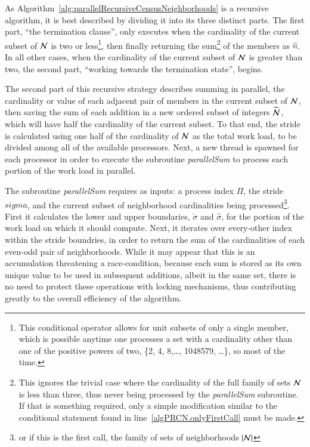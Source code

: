 As Algorithm~\ref{alg:parallelRecursiveCensusNeighborhoods} is a recursive algorithm, it is best described by dividing it into its three distinct parts. The first part, ``the termination clause'', only executes when the cardinality of the current subset of $\mathcal{N}$ is two or less\footnote{This conditional operator allows for unit subsets of only a single member, which is possible anytime one processes a set with a cardinality other than one of the positive powers of two, \{2, 4, 8,\ldots , 1048579, \ldots\}, so most of the time.}, then finally returning the sum\footnote{This ignores the trivial case where the cardinality of the full family of sets $\mathcal{N}$ is less than three, thus never being processed by the \textit{parallelSum} subroutine. If that is something required, only a simple modification similar to the conditional statement found in line~\ref{algPRCN.onlyFirstCall} must be made.} of the members as $\hat{n}$. In all other cases, when the cardinality of the current subset of $\mathcal{N}$ is greater than two, the second part, ``working towards the termination state'', begins.

The second part of this recursive strategy describes summing in parallel, the cardinality or value of each adjacent pair of members in the current subset of $\mathcal{N}$, then saving the sum of each addition in a new ordered subset of integers $\widetilde{\mathcal{N}}$, which will have half the cardinality of the current subset. To that end, the stride is calculated using one half of the cardinality of $\mathcal{N}$ as the total work load, to be divided among all of the available processors. Next, a new thread is spawned for each processor in order to execute the subroutine \textit{parallelSum} to process each portion of the work load in parallel.

The subroutine \textit{parallelSum} requires as inputs: a process index $\Pi$, the stride $sigma$, and the current subset of neighborhood cardinalities being processed\footnote{or if this is the first call, the family of sets of neighborhoods $|\mathcal{N}|$}. First it calculates the lower and upper boundaries, $\check{\sigma}$ and $\hat{\sigma}$, for the portion of the work load on which it should compute. Next, it iterates over every-other index within the stride boundries, in order to return the sum of the cardinalities of each even-odd pair of neighborhoods. While it may appear that this is an accumulation threatening a race-condition, because each sum is stored as its own unique value to be used in subsequent additions, albeit in the same set, there is no need to protect these operations with locking mechanisms, thus contributing greatly to the overall efficiency of the algorithm.

